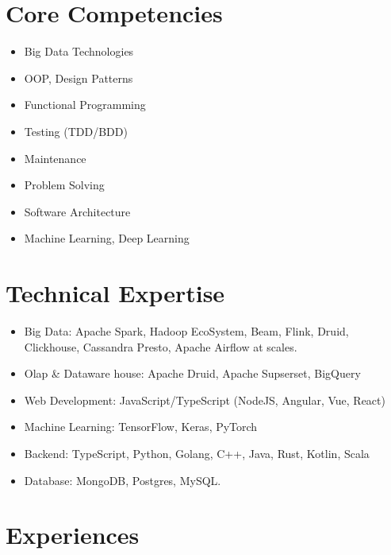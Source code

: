 \documentclass[letterpaper]{twentysecondcv} %
\begin{document}
\section{Core Competencies}
\begin{multicols}{2}
\begin{itemize}
	\item Big Data Technologies
	\item OOP, Design Patterns
	\item Functional Programming
	\item Testing (TDD/BDD)
	\item Maintenance
	\item Problem Solving
	\item Software Architecture
	\item Machine Learning, Deep Learning
\end{itemize}
\end{multicols}

\section{Technical Expertise}
\begin{itemize}
  \item Big Data: Apache Spark, Hadoop EcoSystem, Beam, Flink, Druid, Clickhouse, Cassandra Presto, Apache Airflow at scales.
  \item Olap \& Dataware house: Apache Druid, Apache Supserset, BigQuery
	\item Web Development: JavaScript/TypeScript (NodeJS, Angular, Vue, React)
	\item Machine Learning: TensorFlow, Keras, PyTorch
	\item Backend: TypeScript, Python, Golang, C++, Java, Rust, Kotlin, Scala
	\item Database: MongoDB, Postgres, MySQL.
\end{itemize}


\section{Experiences}
\end{document}

